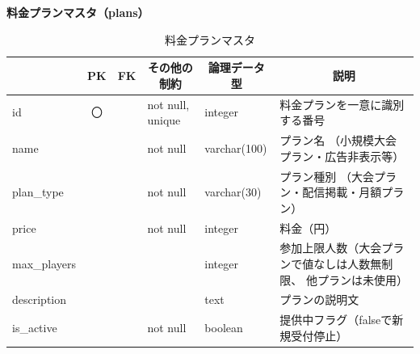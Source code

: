 \noindent\textbf{料金プランマスタ（plans）}
\begin{table}[H]
    \centering
    \caption{料金プランマスタ}
    \label{tab:plans_table}
    \begin{tabularx}{\linewidth}{|l|c|c|l|l|X|}
        \hline
        \rowcolor{tableblue}
        \multicolumn{1}{|c|}{カラム名} & \multicolumn{1}{c|}{PK} & \multicolumn{1}{c|}{FK} & \multicolumn{1}{c|}{その他の制約} & \multicolumn{1}{c|}{論理データ型} & \multicolumn{1}{c|}{説明} \\ \hline
        id & 〇 & & not null, unique & integer & 料金プランを一意に識別する番号 \\ \hline
        name & & & not null & varchar(100) & プラン名 \newline（小規模大会プラン・広告非表示等） \\ \hline
        plan\_type & & & not null & varchar(30) & プラン種別 \newline（大会プラン・配信掲載・月額プラン） \\ \hline
        price & & & not null & integer & 料金（円） \\ \hline
        max\_players & & & & integer & 参加上限人数\newline（大会プランで値なしは人数無制限、 \newline 他プランは未使用） \\ \hline
        description & & & & text & プランの説明文 \\ \hline
        is\_active & & & not null & boolean & 提供中フラグ（falseで新規受付停止） \\ \hline
    \end{tabularx}
\end{table}

